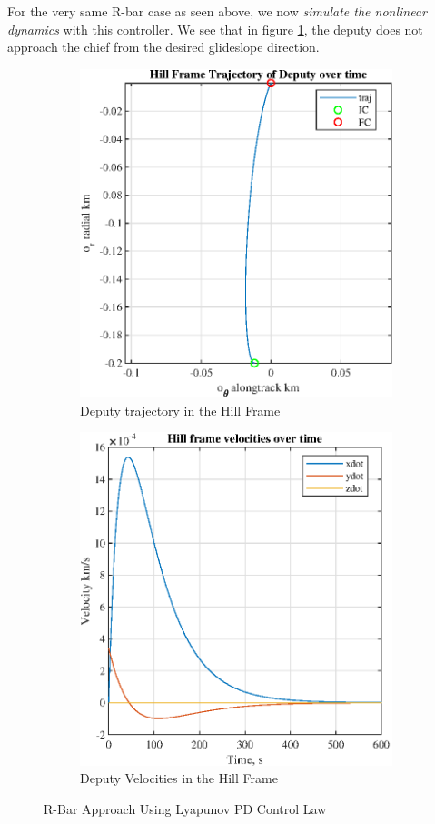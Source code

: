 \documentclass[conf]{new-aiaa}
\begin{document}
\begin{singlespace}
For the very same R-bar case as seen above, we now \textit{simulate the nonlinear dynamics} with this controller. We see that in figure \ref{fig:trajLyap}, the deputy does not approach the chief from the desired glideslope direction.
\begin{figure}[htpb!]
\begin{subfigure}{.5\textwidth}
  \centering
  \includegraphics[width=.8\linewidth]{figures/trajLyap.eps}
  \caption{Deputy trajectory in the Hill Frame}
  \label{fig:trajLyap}
\end{subfigure}%
\begin{subfigure}{.5\textwidth}
  \centering
  \includegraphics[width=.8\linewidth]{figures/velsLyap.eps}
  \caption{Deputy Velocities in the Hill Frame}
  \label{fig:velsLyap_r}
\end{subfigure}
\caption{R-Bar Approach Using Lyapunov PD Control Law}
\label{fig:v1}
\end{figure}





\end{singlespace}
\end{document}
